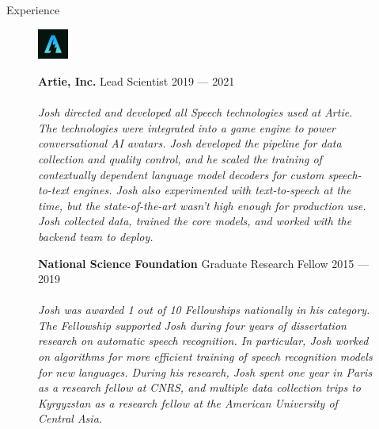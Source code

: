 \documentclass{resume} %
\begin{document}
\begin{rSection}{Experience}
  \begin{figure}[H]
    \begin{minipage}{0.2\textwidth}
      \centering
      \includegraphics[width=1cm]{imgs/artie-logo-small.jpeg}
    \end{minipage}
    \begin{minipage}{0.8\textwidth}
      {\bf Artie, Inc.} \hfill Lead Scientist \hspace{0.5cm} {2019 --- 2021} \\ \\
      \textit{Josh directed and developed all Speech technologies used at Artie. The technologies were integrated into a game engine to power conversational AI avatars. Josh developed the pipeline for data collection and quality control, and he scaled the training of contextually dependent language model decoders for custom speech-to-text engines. Josh also experimented with text-to-speech at the time, but the state-of-the-art wasn't high enough for production use. Josh collected data, trained the core models, and worked with the backend team to deploy.} \\
    \end{minipage}
  \end{figure}

  \begin{figure}[H]
    \begin{minipage}{0.2\textwidth}
      \centering
      
    \end{minipage}
    \begin{minipage}{0.8\textwidth}
      {\bf National Science Foundation} \hfill Graduate Research Fellow \hspace{0.5cm} {2015 --- 2019} \\ \\
      \textit{Josh was awarded 1 out of 10 Fellowships nationally in his category. The Fellowship supported Josh during four years of dissertation research on automatic speech recognition. In particular, Josh worked on algorithms for more efficient training of speech recognition models for new languages. During his research, Josh spent one year in Paris as a research fellow at CNRS, and multiple data collection trips to Kyrgyzstan as a research fellow at the American University of Central Asia.} \\
    \end{minipage}
  \end{figure}


\end{rSection}
\end{document}
